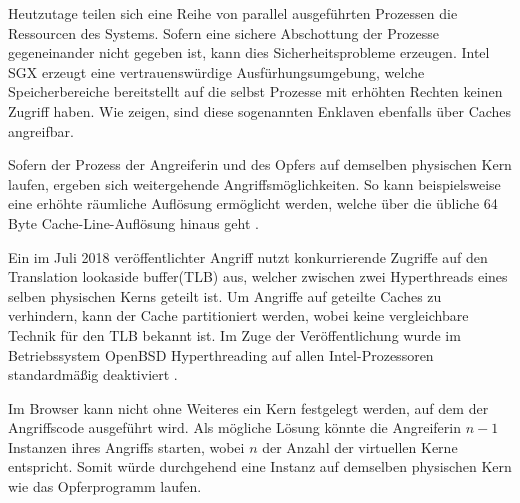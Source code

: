 Heutzutage teilen sich eine Reihe von parallel ausgeführten Prozessen die Ressourcen des Systems.
Sofern eine sichere Abschottung der Prozesse gegeneinander nicht gegeben ist, kann dies Sicherheitsprobleme erzeugen.
Intel SGX erzeugt eine vertrauenswürdige Ausfürhungsumgebung, welche Speicherbereiche bereitstellt auf die selbst Prozesse mit erhöhten Rechten keinen Zugriff haben.
Wie \cite{CacheZoom,CacheAttacksIntelSGX} zeigen, sind diese sogenannten Enklaven ebenfalls über Caches angreifbar.

Sofern der Prozess der Angreiferin und des Opfers auf demselben physischen Kern laufen, ergeben sich weitergehende Angriffsmöglichkeiten.
So kann beispielsweise eine erhöhte räumliche Auflösung ermöglicht werden, welche über die übliche 64 Byte Cache-Line-Auflösung hinaus geht \cite{MemJam}.

Ein im Juli 2018 veröffentlichter Angriff \cite{TLBleed} nutzt konkurrierende Zugriffe auf den Translation lookaside buffer(TLB) aus, welcher zwischen zwei Hyperthreads eines selben physischen Kerns geteilt ist.
Um Angriffe auf geteilte Caches zu verhindern, kann der Cache partitioniert werden, wobei keine vergleichbare Technik für den TLB bekannt ist.
Im Zuge der Veröffentlichung wurde im Betriebssystem OpenBSD Hyperthreading auf allen Intel-Prozessoren standardmäßig deaktiviert \cite{OpenBSDHyperthreading}.

Im Browser kann nicht ohne Weiteres ein Kern festgelegt werden, auf dem der Angriffscode ausgeführt wird.
Als mögliche Lösung könnte die Angreiferin $n-1$ Instanzen ihres Angriffs starten, wobei $n$ der Anzahl der virtuellen Kerne entspricht.
Somit würde durchgehend eine Instanz auf demselben physischen Kern wie das Opferprogramm laufen.